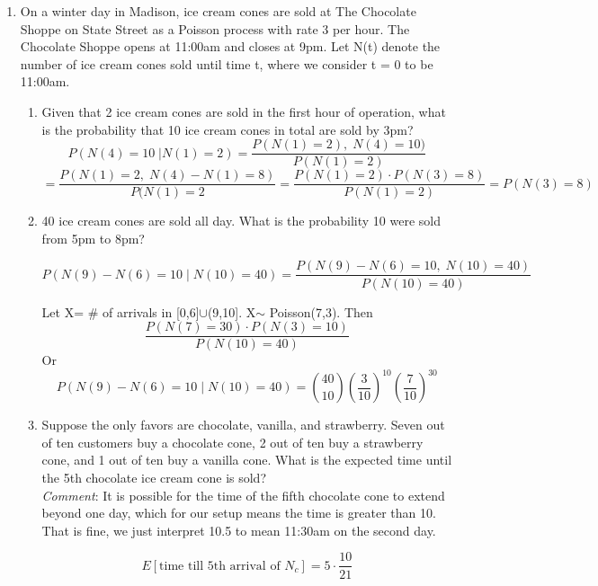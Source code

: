\documentclass[12pt]{article}
\begin{document}


\begin{enumerate}
    \item On a winter day in Madison, ice cream cones are sold at The Chocolate Shoppe on State Street as a Poisson process with rate 3 per hour. The Chocolate Shoppe opens at 11:00am and closes at 9pm. Let N(t) denote the number of ice cream cones sold until time t, where we consider t = 0 to be 11:00am.
    
    \begin{enumerate}[label=(\alph*)]
        \item Given that 2 ice cream cones are sold in the first hour of operation, what is the probability that 10 ice cream cones in total are sold by 3pm?
        $$P(N(4)=10\;|N(1)=2) = \frac{P(N(1)=2),\;N(4)=10)}{P(N(1)=2)}$$
        $$=\frac{P(N(1)=2,\;N(4)-N(1)=8)}{P(N(1)=2} = \frac{P(N(1)=2)\cdot P(N(3)=8)}{P(N(1)=2)}=P(N(3)=8)$$
        \item 40 ice cream cones are sold all day. What is the probability 10 were sold from 5pm to 8pm?
        
        $$P(N(9)-N(6)=10\;|\;N(10)=40) 
        =\frac{P(N(9)-N(6)=10,\;N(10)=40)}{P(N(10)=40)}$$
        
        Let X= \# of arrivals in [0,6]$\cup$(9,10]. X$\sim$ Poisson(7,3). Then
        $$\frac{P(N(7)=30)\cdot P(N(3)=10)}{P(N(10)=40)}$$
        Or
        $$P(N(9)-N(6)=10\;|\;N(10)=40) = \binom{40}{10}\left(\frac{3}{10}\right)^{10}\left(\frac{7}{10}\right)^{30}$$
        \item Suppose the only favors are chocolate, vanilla, and strawberry. Seven out of ten customers buy a chocolate cone, 2 out of ten buy a strawberry cone, and 1 out of ten buy a vanilla cone. What is the expected time until the 5th chocolate ice cream cone is sold? \\
        {\sl Comment}: It is possible for the time of the fifth chocolate cone to extend beyond one day, which for our setup means the time is greater than 10. That is fine, we just interpret 10.5 to mean 11:30am on the second day.
        
        $$E[\text{time till 5th arrival of $N_c$}]=5\cdot \frac{10}{21}$$
        

\end{enumerate}
\end{enumerate}
\end{document}
